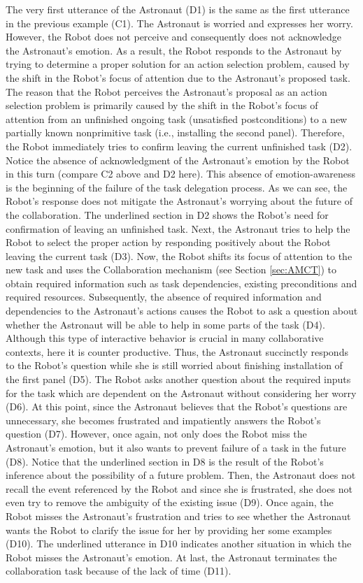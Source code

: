 The very first utterance of the Astronaut (D1) is the same as
the first utterance in the previous example (C1). The Astronaut is worried and
expresses her worry. However, the Robot does not perceive and consequently does
not acknowledge the Astronaut's emotion. As a result, the Robot responds to the
Astronaut by trying to determine a proper solution for an action selection
problem, caused by the shift in the Robot's focus of attention due to the
Astronaut's proposed task. The reason that the Robot perceives the Astronaut's
proposal as an action selection problem is primarily caused by the shift in the
Robot's focus of attention from an unfinished ongoing task (unsatisfied
postconditions) to a new partially known nonprimitive task (i.e., installing the
second panel). Therefore, the Robot immediately tries to confirm leaving the
current unfinished task (D2). Notice the absence of acknowledgment of the
Astronaut's emotion by the Robot in this turn (compare C2 above and D2 here).
This absence of emotion-awareness is the beginning of the failure of the task
delegation process. As we can see, the Robot's response does not mitigate the
Astronaut's worrying about the future of the collaboration. The underlined
section in D2 shows the Robot's need for confirmation of leaving an unfinished
task. Next, the Astronaut tries to help the Robot to select the proper action by
responding positively about the Robot leaving the current task (D3). Now, the
Robot shifts its focus of attention to the new task and uses the Collaboration
mechanism (see Section \ref{sec:AMCT}) to obtain required information such as
task dependencies, existing preconditions and required resources. Subsequently,
the absence of required information and dependencies to the Astronaut's actions
causes the Robot to ask a question about whether the Astronaut will be able to
help in some parts of the task (D4). Although this type of interactive behavior
is crucial in many collaborative contexts, here it is counter productive. Thus,
the Astronaut succinctly responds to the Robot's question while she is still
worried about finishing installation of the first panel (D5). The Robot asks
another question about the required inputs for the task which are dependent on
the Astronaut without considering her worry (D6). At this point, since the
Astronaut believes that the Robot's questions are unnecessary, she becomes
frustrated and impatiently answers the Robot's question (D7). However, once
again, not only does the Robot miss the Astronaut's emotion, but it also wants
to prevent failure of a task in the future (D8). Notice that the underlined
section in D8 is the result of the Robot's inference about the possibility of a
future problem. Then, the Astronaut does not recall the event referenced by the
Robot and since she is frustrated, she does not even try to remove the ambiguity
of the existing issue (D9). Once again, the Robot misses the Astronaut's
frustration and tries to see whether the Astronaut wants the Robot to clarify
the issue for her by providing her some examples (D10). The underlined utterance
in D10 indicates another situation in which the Robot misses the Astronaut's
emotion. At last, the Astronaut terminates the collaboration task because of the
lack of time (D11).

